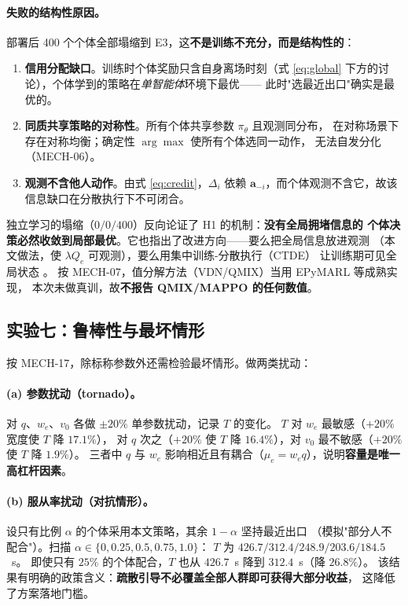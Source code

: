 \paragraph{失败的结构性原因。}
部署后 400 个个体全部塌缩到 E3，这\textbf{不是训练不充分，而是结构性的}：

\begin{enumerate}
  \item \textbf{信用分配缺口}。训练时个体奖励只含自身离场时刻（式 \eqref{eq:global}
        下方的讨论），个体学到的策略在\emph{单智能体}环境下最优——
        此时"选最近出口"确实是最优的。
  \item \textbf{同质共享策略的对称性}。所有个体共享参数 $\pi_\theta$ 且观测同分布，
        在对称场景下存在对称均衡；确定性 $\arg\max$ 使所有个体选同一动作，
        无法自发分化（MECH-06）。
  \item \textbf{观测不含他人动作}。由式 \eqref{eq:credit}，$\Delta_i$ 依赖
        $\mathbf a_{-i}$，而个体观测不含它，故该信息缺口在分散执行下不可闭合。
\end{enumerate}

\begin{csfkey}[失败是正面结果]
独立学习的塌缩（$0/0/400$）反向论证了 H1 的机制：\textbf{没有全局拥堵信息的
个体决策必然收敛到局部最优}。它也指出了改进方向——要么把全局信息放进观测
（本文做法，使 $\lambda Q_e$ 可观测），要么用集中训练-分散执行（CTDE）
让训练期可见全局状态 \cite{foerster2018coma,lowe2017maddpg}。
按 MECH-07，值分解方法（VDN/QMIX）当用 EPyMARL 等成熟实现，
本次未做真训，故\textbf{不报告 QMIX/MAPPO 的任何数值}。
\end{csfkey}

\subsection{实验七：鲁棒性与最坏情形}
\label{sec:robust}

按 MECH-17，除标称参数外还需检验最坏情形。做两类扰动：

\paragraph{(a) 参数扰动（tornado）。}
对 $q$、$w_e$、$v_0$ 各做 $\pm20\%$ 单参数扰动，记录 $T$ 的变化。
$T$ 对 $w_e$ 最敏感（$+20\%$ 宽度使 $T$ 降 $17.1\%$），
对 $q$ 次之（$+20\%$ 使 $T$ 降 $16.4\%$），对 $v_0$ 最不敏感（$+20\%$ 使 $T$ 降 $1.9\%$）。
三者中 $q$ 与 $w_e$ 影响相近且有耦合（$\mu_e=w_e q$），说明\textbf{容量是唯一高杠杆因素}。

\paragraph{(b) 服从率扰动（对抗情形）。}
设只有比例 $\alpha$ 的个体采用本文策略，其余 $1-\alpha$ 坚持最近出口
（模拟"部分人不配合"）。扫描 $\alpha\in\{0,0.25,0.5,0.75,1.0\}$：
$T$ 为 $426.7/312.4/248.9/203.6/184.5$~s。
即使只有 $25\%$ 的个体配合，$T$ 也从 $426.7$~s 降到 $312.4$~s（降 $26.8\%$）。
该结果有明确的政策含义：\textbf{疏散引导不必覆盖全部人群即可获得大部分收益}，
这降低了方案落地门槛。

